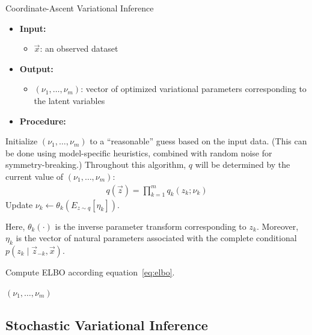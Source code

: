\documentclass{article}
\newcommand{\hackystatei}[1]{\State \parbox[t]{\dimexpr\linewidth-\algorithmicindent}{#1\strut}}
\newcommand{\hackystateii}[1]{\State \parbox[t]{\dimexpr\linewidth-\algorithmicindent-\algorithmicindent}{#1\strut}}
\begin{document}
\begin{algorithm}[hbt]
\caption{Coordinate-Ascent Variational Inference}
\label{alg:cavi}
\renewcommand{\labelitemi}{{$\bullet$}}
\renewcommand{\labelitemii}{{\tiny$\blacksquare$}}
\begin{itemize}[leftmargin=*]
\item \textbf{Input:}
  \begin{itemize}
  \item $\vec x$: an observed dataset
  \end{itemize}
\item \textbf{Output:}
  \begin{itemize}
  \item $(\nu_1, \ldots, \nu_m)$: vector of optimized variational parameters corresponding to the latent variables
  \end{itemize}
\item \textbf{Procedure:}
\end{itemize}
\begin{algorithmic}
\State Initialize $(\nu_1, \ldots, \nu_m)$ to a ``reasonable'' guess based on the input data.
(This can be done using model-specific heuristics, combined with random noise for symmetry-breaking.)
\State Throughout this algorithm, $q$ will be determined by the current value of $(\nu_1, \ldots, \nu_m)$:
\begin{align*}
q(\vec z) = \prod_{k=1}^m q_k(z_k; \nu_k)
\end{align*}
    \State Update $\nu_k \gets \theta_k(E_{z \sim q}[\eta_k])$.
    \hackystateii{Here, $\theta_k(\cdot)$ is the inverse parameter transform corresponding to $z_k$.
    Moreover, $\eta_k$ is the vector of natural parameters associated with the complete conditional $p(z_k \mid \vec z_{-k}, \vec x)$.}
  \EndFor
  \hackystatei{Compute ELBO according equation~\eqref{eq:elbo}.}
\EndWhile
\State \Return $(\nu_1, \ldots, \nu_m)$
\end{algorithmic}
\end{algorithm}

\subsection{Stochastic Variational Inference}
\label{sec:svi}
\end{document}
